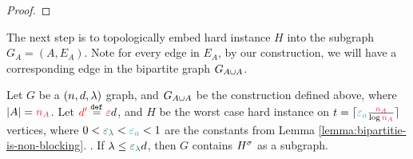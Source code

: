 \documentclass[11pt]{article}
\newcommand{\dApproxLower}{\textcolor{red}{d'}}
\begin{document}
\begin{proof}
%
%
%
%
%

\end{proof}


The next step is to topologically embed hard instance $H$ into the subgraph $G_A = (A, E_A)$.
Note for every edge in $E_A$, by our construction, we will have a corresponding edge in the bipartite graph $G_{A \cup A}$.

\begin{theorem}\label{thm:top-embedding}
Let $G$ be a $(n, d, \lambda)$ graph, and $G_{A \cup A}$ be the construction defined above, where $|A| = \na$.
Let $\dApproxLower \Def \Eps d$, and $H$ be the worst case hard instance on $t = \lceil\epsilonA \frac{\na}{\log \na}\rceil$ vertices, where $0 < \epsilonL < \epsilonA <1$ are the constants from  Lemma \ref{lemma:bipartitie-is-non-blocking}.	
.
If $\lambda \leq \epsilonL d$, then $G$ contains ${H}^{\sigma}$ as a subgraph.

\end{theorem}
\end{document}
